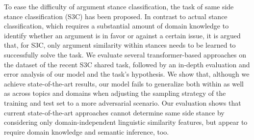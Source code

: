 To ease the difficulty of argument stance classification, the task of same side stance classification (S3C) has been proposed. In contrast to actual stance classification, which requires a substantial amount of domain knowledge to identify whether an argument is in favor or against a certain issue, it is argued that, for S3C, only argument similarity within stances needs to be learned to successfully solve the task. We evaluate several transformer-based approaches on the dataset of the recent S3C shared task, followed by an in-depth evaluation and error analysis of our model and the task's hypothesis. We show that, although we achieve state-of-the-art results, our model fails to generalize both within as well as across topics and domains when adjusting the sampling strategy of the training and test set to a more adversarial scenario. Our evaluation shows that current state-of-the-art approaches cannot determine same side stance by considering only domain-independent linguistic similarity features, but appear to require domain knowledge and semantic inference, too.
